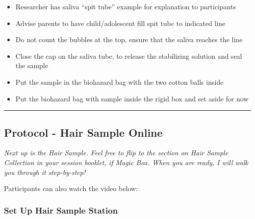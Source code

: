 \documentclass[]{book}
\providecommand{\tightlist}{%
  \setlength{\itemsep}{0pt}\setlength{\parskip}{0pt}}
\begin{document}
\begin{itemize}
\tightlist
\item
  Researcher has saliva ``spit tube'' example for explanation to participants
\item
  Advise parents to have child/adolescent fill spit tube to indicated line
\item
  Do not count the bubbles at the top, ensure that the saliva reaches the line
\item
  Close the cap on the saliva tube, to release the stabilizing solution and seal the sample
\item
  Put the sample in the biohazard bag with the two cotton balls inside
\item
  Put the biohazard bag with sample inside the rigid box and set aside for now
\end{itemize}

\begin{center}\rule{0.5\linewidth}{0.5pt}\end{center}

\hypertarget{protocol---hair-sample-online}{%
\subsection{Protocol - Hair Sample Online}\label{protocol---hair-sample-online}}

\emph{Next up is the Hair Sample. Feel free to flip to the section on Hair Sample Collection in your session booklet, if Magic Box. When you are ready, I will walk you through it step-by-step!}

Participants can also watch the video below:

\hypertarget{set-up-hair-sample-station}{%
\subsubsection{Set Up Hair Sample Station}\label{set-up-hair-sample-station}}
\end{document}
